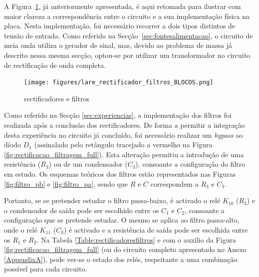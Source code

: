 A Figura~\ref{fig:implementacaoplacarectificadores}, já anteriormente apresentada, é aqui retomada para ilustrar com maior clareza a correspondência entre o circuito e a sua implementação física na placa. Nesta implementação, foi necessário recorrer a dois tipos distintos de tensão de entrada. Como referido na Secção~\ref{sec:fontesalimentacao}, o circuito de meia onda utiliza o gerador de sinal, mas, devido ao problema de massa já descrito nessa mesma secção, optou-se por utilizar um transformador no circuito de rectificação de onda completa.

\begin{figure}[hbtp]
	\centering
	\texttt{[image: figures/lare\_rectificador\_filtros\_BLOCOS.png]}
	\caption{ rectificadores e filtros}
	\label{fig:implementacaoplacarectificadores}
\end{figure}

Como referido na Secção \ref{sec:experiencias}, a implementação dos filtros foi realizada após a conclusão dos rectificadores. De forma a permitir a integração desta experiência no circuito já concluído, foi necessário realizar um \textit{bypass} ao díodo $D_{1}$ (assinalado pelo retângulo tracejado a vermelho na Figura \ref{fig:rectificacao_filtragem_full}). Esta alteração permitiu a introdução de uma resistência ($R_{3}$) ou de um condensador ($C_{3}$), consoante a configuração do filtro em estudo. Os esquemas teóricos dos filtros estão representados nas Figuras \ref{fig:filtro_pb} e \ref{fig:filtro_pa}, sendo que $R$ e $C$  correspondem a $R_{3}$ e $C_{3}$. 

Portanto, se se pretender estudar o filtro passa-baixo, é activado o relé $K_{10}$ ($R_{3}$) e o condensador de saída pode ser escolhido entre os $C_{1}$ e $C_{2}$, consoante a configuração que se pretende estudar. O mesmo se aplica ao filtro passa-alto, onde o relé $K_{11}$ ($C_{3}$) é activado e a resistência de saída pode ser escolhida entre os $R_{1}$ e $R_{2}$. Na Tabela \ref{Table:rectificadoresfiltros} e com o auxílio da Figura \ref{fig:rectificacao_filtragem_full} (ou do circuito completo apresentado no Anexo \ref{AppendixA}), pode ver-se o estado dos relés, respeitante a uma combinação possível para cada circuito. 


